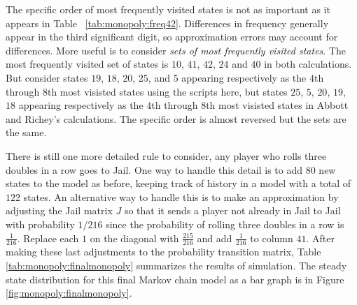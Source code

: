 \documentclass[12pt]{article}
\begin{document}
The specific order of most frequently visited states is not as important
as it appears in Table~%
\ref{tab:monopoly:freq42}. Differences in frequency generally appear in
the third significant digit, so approximation errors may account for
differences.  More useful is to consider \emph{sets of most frequently
visited states}. The most frequently visited set of states is \( 10 \), \(
41 \), \( 42 \), \( 24 \) and \( 40 \) in both calculations. But
consider states \( 19 \), \( 18 \), \( 20 \), \( 25 \), and \( 5 \)
appearing respectively as the \( 4 \)th through \( 8 \)th most visisted
states using the scripts here, but states \( 25 \), \( 5 \), \( 20 \), \(
19 \), \( 18 \) appearing respectively as the \( 4 \)th through \( 8 \)th
most visisted states in Abbott and Richey's calculations.  The specific
order is almost reversed but the sets are the same.

There is still one more detailed rule to consider, any player who rolls
three doubles in a row goes to Jail.  One way to handle this detail is
to add \( 80 \) new states to the model as before, keeping track of
history in a model with a total of \( 122 \) states.  An alternative way
to handle this is to make an approximation by adjusting the Jail matrix \(
J \) so that it sends a player not already in Jail to Jail with
probability \( 1/216 \) since the probability of rolling three doubles
in a row is \( \frac{1}{216} \).  Replace each \( 1 \) on the diagonal
with \( \frac{215}{216} \) and add \( \frac{1}{216} \) to column \( 41 \).
After making these last adjustments to the probability transition
matrix, Table~%
\ref{tab:monopoly:finalmonopoly} summarizes the results of simulation. The
steady state distribution for this final Markov chain model as a bar
graph is in Figure~%
\ref{fig:monopoly:finalmonopoly}.
\end{document}
